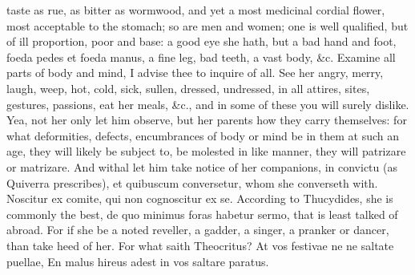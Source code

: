 {taste as rue, as bitter as wormwood, and yet a most medicinal cordial
flower, most acceptable to the stomach; so are men and women; one is
well qualified, but of ill proportion, poor and base: a good eye she
hath, but a bad hand and foot, foeda pedes et foeda manus, a fine leg,
bad teeth, a vast body, \&c. Examine all parts of body and mind, I
advise thee to inquire of all. See her angry, merry, laugh, weep, hot,
cold, sick, sullen, dressed, undressed, in all attires, sites,
gestures, passions, eat her meals, \&c., and in some of these you will
surely dislike. Yea, not her only let him observe, but her parents how
they carry themselves: for what deformities, defects, encumbrances of
body or mind be in them at such an age, they will likely be subject to,
be molested in like manner, they will patrizare or matrizare. And
withal let him take notice of her companions, in convictu (as Quiverra
prescribes), et quibuscum conversetur, whom she converseth with.
Noscitur ex comite, qui non cognoscitur ex se. According to
Thucydides, she is commonly the best, de quo minimus foras habetur
sermo, that is least talked of abroad. For if she be a noted reveller,
a gadder, a singer, a pranker or dancer, than take heed of her. For
what saith Theocritus?
At vos festivae ne ne saltate puellae,
En malus hireus adest in vos saltare paratus.

}

